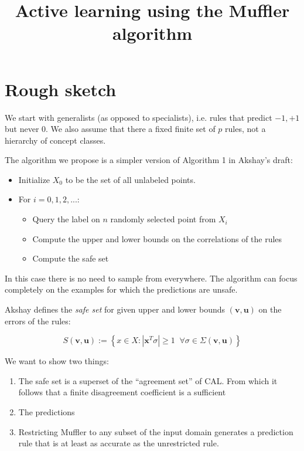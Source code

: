 \documentclass{article}
\newcommand{\bu}{{\mathbf u}}
\newcommand{\bv}{{\mathbf v}}
\newcommand{\bx}{{\mathbf x}}
\begin{document}
\title{Active learning using the Muffler algorithm}

\maketitle

\section{Rough sketch}
We start with generalists (as opposed to specialists), i.e. rules that
predict $-1,+1$ but never $0$. We also assume that there a fixed
finite set of $p$ rules, not a hierarchy of concept classes.

The algorithm we propose is a simpler version of Algorithm 1 in
Akshay's draft:

\begin{itemize}
\item Initialize $X_0$ to be the set of all unlabeled points.
\item For $i=0,1,2,...$:
  \begin{itemize}
  \item Query the label on $n$ randomly selected point from $X_i$
  \item Compute the upper and lower bounds on the correlations of the
    rules
  \item Compute the safe set 
  
  \end{itemize}
\end{itemize}


In this case there
is no need to sample from everywhere. The algorithm can focus
completely on the examples for which the predictions are unsafe.

Akshay defines the {\em safe set} for given upper and lower bounds
$(\bv,\bu)$ on the errors of the rules:

$$S(\bv,\bu) := \left\{x \in X : \left| \bx^T \sigma \right|\geq
1 \;\; \forall \sigma \in \Sigma(\bv,\bu) \right\} $$

We want to show two things:
\begin{enumerate}
\item The safe set is a superset of the ``agreement set'' of CAL. From
  which it follows that a finite disagreement coefficient is a
  sufficient 
\item The predictions   
\item Restricting Muffler to any subset of the input domain
    generates a prediction rule that is at least as accurate as the
    unrestricted rule.
\end{enumerate}
\end{document}
